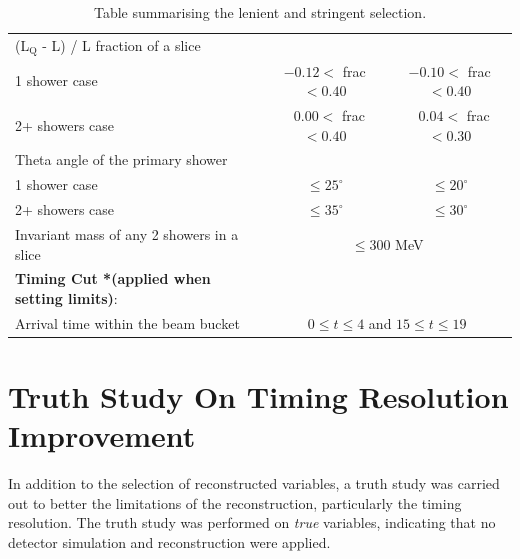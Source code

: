 \begin{table}[htbp!]
\begin{center}
\begin{tabular}{| p{7.75cm} | m{3.25cm} | m{3.25cm} |}
 \cline{2-3}
 (L$_\mathrm{Q}$ - L) / L fraction of a slice &  &  \\
  \hspace{0.5cm} 1 shower case & \multicolumn{1}{c|}{$-0.12 <$ frac $< 0.40$} & \multicolumn{1}{c|}{$-0.10 <$ frac $< 0.40$} \\
  \hspace{0.5cm} 2+ showers case & \multicolumn{1}{c|}{$\ \ \ 0.00 <$ frac $< 0.40$} & \multicolumn{1}{c|}{$\ \ \ 0.04 <$ frac $< 0.30$} \\ [1ex]
  Theta angle of the primary shower &  &  \\
  \hspace{0.5cm}1 shower case & \multicolumn{1}{c|}{$\leq 25^\circ$} & \multicolumn{1}{c|}{$\leq20^\circ$} \\
  \hspace{0.5cm}2+ showers case & \multicolumn{1}{c|}{$\leq 35^\circ$} & \multicolumn{1}{c|}{$\leq 30^\circ$} \\ [1ex]
  \cline{2-3} 
  Invariant mass of any 2 showers in a slice  & \multicolumn{2}{c|}{$\leq 300$ MeV} \\ [1ex]
 \hline
 \textbf{Timing Cut *(applied when setting limits)}: &  \multicolumn{2}{c|}{} \\ [1ex] 
 Arrival time within the beam bucket  & \multicolumn{2}{c|}{$0 \leq t \leq 4$ and $15 \leq t \leq 19$} \\ [1ex]
 \hline
\end{tabular}
\end{center}
\caption{Table summarising the lenient and stringent selection.}
\label{table:cut_summary}
\end{table}


\section{Truth Study On Timing Resolution Improvement}
\label{sec:truth_bucket}

In addition to the selection of reconstructed variables, a truth study was carried out to better the limitations of the reconstruction, particularly the timing resolution.
The truth study was performed on \textit{true} variables, indicating that no detector simulation and reconstruction were applied.


